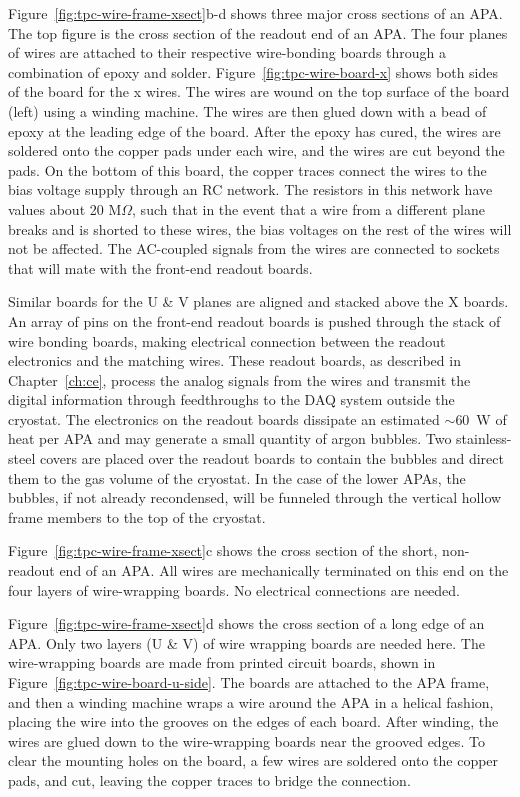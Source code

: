 Figure~\ref{fig:tpc-wire-frame-xsect}b-d shows three major cross sections of an APA.  The top figure is the cross section of the readout end of an 
APA.  The four planes of wires are attached to their respective 
wire-bonding boards through a combination of epoxy and solder.
Figure~\ref{fig:tpc-wire-board-x} shows both sides of the board for the x wires.  
The wires are wound on the top surface of the board (left) using a winding machine.  The wires are then glued down with a bead of epoxy at the leading edge of the board.  After the epoxy has cured, the wires are soldered onto the copper pads under each wire, and the wires are cut beyond the pads.  On the bottom of this board, the copper traces connect the wires to the bias voltage supply through an RC network.  The resistors in this network have values about 20 M$\Omega$, such that in the event that a wire from a different plane breaks and is shorted to these wires, the bias voltages on the rest of the wires will not be affected. The AC-coupled signals from the wires are connected to sockets that will mate with the front-end readout boards.

Similar boards for the U \& V planes are aligned and stacked above the X boards.   An array of pins on the front-end readout boards is pushed through the stack of wire bonding boards, making electrical connection between the readout electronics and the matching wires. These readout boards, as described 
in Chapter~\ref{ch:ce}, process the analog signals from the wires and transmit 
the digital information through feedthroughs to the DAQ system outside 
the cryostat.  The electronics on the readout boards dissipate an estimated $\sim$60~W of heat per APA and may generate a small quantity of argon bubbles.
Two stainless-steel covers are placed over the readout boards to contain 
the bubbles and direct them to the gas volume of the cryostat. In the case of the lower APAs, the bubbles, if not already recondensed, will be funneled through the vertical hollow frame members to the top of the cryostat.

Figure~\ref{fig:tpc-wire-frame-xsect}c shows the cross section of the short, non-readout end 
of an APA. All wires are mechanically terminated on this end on the four layers 
of wire-wrapping boards.  No electrical connections are needed. 


Figure~\ref{fig:tpc-wire-frame-xsect}d shows the cross section of a long edge of an APA. 
Only two layers (U \& V) of wire wrapping boards are needed here. The wire-wrapping boards are 
made from printed circuit boards, shown in Figure~\ref{fig:tpc-wire-board-u-side}. The boards are attached to the APA frame, and then a winding machine wraps a wire around the APA in a helical fashion, placing the wire into the grooves on the edges of each board. After winding, the wires are glued down to the wire-wrapping boards near the grooved edges.  To clear the mounting holes on the board, a few wires are soldered onto the copper pads, and cut, leaving the copper traces to bridge the connection.  
 
